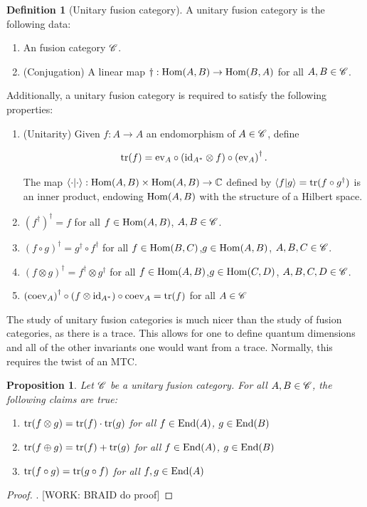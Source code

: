 \documentclass{article}
\newtheorem{proposition}{Proposition}[section]
\theoremstyle{definition}
\newtheorem*{definition}{Definition}
\numberwithin{figure}{section}
\begin{document}
\begin{definition}[Unitary fusion category] A unitary fusion category is the following data:

\begin{enumerate}
\item An fusion category $\mathscr{C}$.
\item (Conjugation) A linear map $\dagger: \mathrm{Hom}(A,B)\to \mathrm{Hom}(B,A)$ for all $A,B\in \mathscr{C}$.
\end{enumerate}

Additionally, a unitary fusion category is required to satisfy the following properties:

\begin{enumerate}
\item (Unitarity) Given $f:A\to A$ an endomorphism of $A\in \mathscr{C}$, define


$$\mathrm{tr}(f)=\mathrm{ev}_A \circ (\mathrm{id}_{A^*}\otimes f)\circ \left(\mathrm{ev}_A\right)^{\dagger}.$$

The map $\left<\cdot|\cdot\right>:\mathrm{Hom}(A,B)\times \mathrm{Hom}(A,B)\to \mathbb{C}$ defined by $\left<f|g\right>=\mathrm{tr}(f\circ g^{\dagger})$ is an inner product, endowing $\mathrm{Hom}(A,B)$ with the structure of a Hilbert space.
\item $\left(f^{\dagger}\right)^{\dagger}=f$ for all $f\in \mathrm{Hom}(A,B)$, $A,B\in \mathscr{C}$.
\item $(f\circ g)^{\dagger}=g^{\dagger}\circ f^{\dagger}$ for all $f\in \mathrm{Hom}(B,C)$,$g\in \mathrm{Hom}(A,B)$, $A,B,C\in \mathscr{C}$.
\item $(f\otimes g)^{\dagger}=f^{\dagger}\otimes g^{\dagger}$ for all $f\in \mathrm{Hom}(A,B)$,$g\in \mathrm{Hom}(C,D)$, $A,B,C,D\in \mathscr{C}$.
\item $\left(\mathrm{coev}_A\right)^{\dagger}\circ (f \otimes \mathrm{id}_{A^*})\circ \mathrm{coev}_A=\mathrm{tr}(f)$ for all $A\in \mathscr{C}$
\end{enumerate}

\raggedleft\qedsymbol{}
\end{definition}

The study of unitary fusion categories is much nicer than the study of fusion categories, as there is a trace. This allows for one to define quantum dimensions and all of the other invariants one would want from a trace. Normally, this requires the twist of an MTC.

\begin{proposition} Let $\mathscr{C}$ be a unitary fusion category. For all $A,B\in \mathscr{C}$, the following claims are true:

\begin{enumerate}
\item $\mathrm{tr}(f\otimes g)=\mathrm{tr}(f)\cdot \mathrm{tr}(g)$ for all $f\in \mathrm{End}(A)$, $g\in \mathrm{End}(B)$
\item $\mathrm{tr}(f\oplus g)=\mathrm{tr}(f)+\mathrm{tr}(g)$ for all $f\in \mathrm{End}(A)$, $g\in \mathrm{End}(B)$
\item $\mathrm{tr}(f\circ g)=\mathrm{tr}(g\circ f)$ for all $f,g\in \mathrm{End}(A)$
\end{enumerate}
\end{proposition}
\begin{proof}. [WORK: BRAID do proof]
\end{proof}
\end{document}
